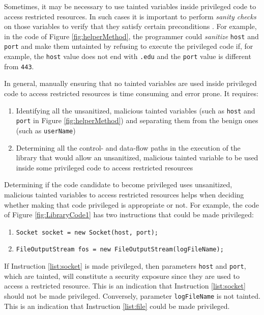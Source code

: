 Sometimes, it may be necessary to use tainted variables inside
privileged code to access restricted resources. In such cases it
is important to perform \emph{sanity checks} on those variables to
verify that they satisfy certain preconditions
\cite{paper:AshcraftEngler2002}. For example, in the code of
Figure \ref{fig:helperMethod}, the programmer could
\emph{sanitize} \texttt{host} and \texttt{port} and make them
untainted by refusing to execute the privileged code if, for
example, the \texttt{host} value does not end with \texttt{.edu}
and the \texttt{port} value is different from \texttt{443}.

In general, manually ensuring that no tainted variables are used
inside privileged code to access restricted resources is time
consuming and error prone. It requires:
\begin{enumerate}
	\item Identifying all the unsanitized, malicious tainted
	variables (such as \texttt{host} and \texttt{port} in Figure \ref{fig:helperMethod})
	and separating them from the benign ones (such as \texttt{userName})
	\item Determining all the control- and data-flow paths in the execution of the library that
	would allow an unsanitized, malicious tainted variable to be
	used inside some privileged code to access restricted
	resources
\end{enumerate}

Determining if the code candidate to become privileged uses
unsanitized, malicious tainted variables to access restricted
resources helps when deciding whether making that code privileged
is appropriate or not. For example, the code of Figure
\ref{fig:LibraryCode1} has two instructions that could be made
privileged:
\begin{enumerate}
	\item \texttt{Socket socket = new Socket(host, port);}
	\label{list:socket}
	\item \texttt{FileOutputStream fos = new FileOutputStream(logFileName);}
	\label{list:file}
\end{enumerate}
If Instruction \ref{list:socket} is made privileged, then
parameters \verb"host" and \verb"port", which are tainted, will
constitute a security exposure since they are used to access a
restricted resource. This is an indication that Instruction
\ref{list:socket} should not be made privileged. Conversely,
parameter \verb"logFileName" is not tainted. This is an indication
that Instruction \ref{list:file} could be made privileged.

